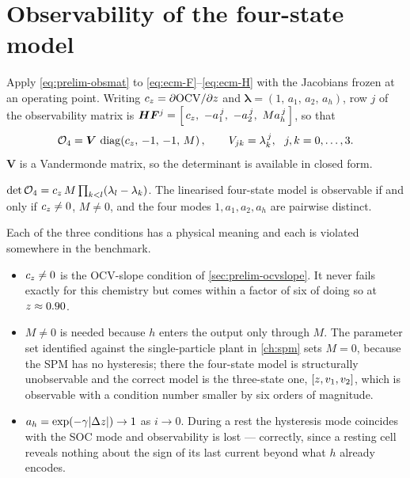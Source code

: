 \section{Observability of the four-state model}
\label{sec:ecm-obs}

Apply \eqref{eq:prelim-obsmat} to \eqref{eq:ecm-F}--\eqref{eq:ecm-H} with the Jacobians frozen at
an operating point. Writing $c_z = \partial\mathrm{OCV}/\partial z$ and
$\bm\lambda = (1,\,a_1,\,a_2,\,a_h)$, row $j$ of the observability matrix is
$\bm{H}\bm{F}^{j} = \left[\,c_z,\ -a_1^{\,j},\ -a_2^{\,j},\ M a_h^{\,j}\,\right]$, so that
\begin{equation}
\mathcal{O}_4 = \bm{V}\,\operatorname{diag}\!\left(c_z,\,-1,\,-1,\,M\right),
\qquad V_{jk} = \lambda_k^{\,j},\ \ j,k = 0,\dots,3 .
\label{eq:ecm-Ostruct}
\end{equation}
$\bm{V}$ is a Vandermonde matrix, so the determinant is available in closed form.

\begin{proposition}\label{prop:ecm-rank}
$\det\mathcal{O}_4 = c_z\,M\prod_{k<l}(\lambda_l-\lambda_k)$. The linearised four-state model
is observable if and only if $c_z\neq 0$, $M\neq 0$, and the four modes
$1, a_1, a_2, a_h$ are pairwise distinct.
\end{proposition}

Each of the three conditions has a physical meaning and each is violated somewhere in the
benchmark.
\begin{itemize}[nosep,leftmargin=*]
\item $c_z\ne 0$ is the OCV-slope condition of \cref{sec:prelim-ocvslope}. It never fails
  exactly for this chemistry but comes within a factor of six of doing so at $z\approx0.90$.
\item $M\ne 0$ is needed because $h$ enters the output only through $M$. The parameter set
  identified against the single-particle plant in \cref{ch:spm} sets $M=0$, because the SPM has
  no hysteresis; there the four-state model is structurally unobservable and the correct model is
  the three-state one, $[z,v_1,v_2]$, which is observable with a condition number smaller by
  six orders of magnitude.
\item $a_h = \exp(-\gamma|\Delta z|)\to 1$ as $i\to0$. During a rest the hysteresis mode
  coincides with the SOC mode and observability is lost --- correctly, since a resting cell
  reveals nothing about the sign of its last current beyond what $h$ already encodes.
\end{itemize}

